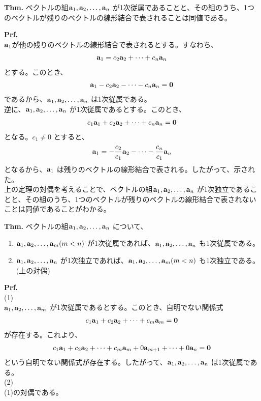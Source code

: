 \documentclass[a4paper,11pt]{jsarticle}
\numberwithin{equation}{section}
\begin{document}
\begin{itembox}[l]{\textbf{Thm.}}
  ベクトルの組$\vb{a}_1, \vb{a}_2, \dots, \vb{a}_n$ が1次従属であることと、その組のうち、1つのベクトルが残りのベクトルの線形結合で表されることは同値である。
\end{itembox}
\textbf{Prf.}\\
$\vb{a}_1$が他の残りのベクトルの線形結合で表されるとする。すなわち、
\begin{align}
  \vb{a}_1 = c_2\vb{a}_2 + \dots + c_n\vb{a}_n
\end{align}
とする。このとき、
\begin{align}
  \vb{a}_1 - c_2\vb{a}_2 - \dots - c_n\vb{a}_n = \vb{0}
\end{align}
であるから、$\vb{a}_1, \vb{a}_2, \dots, \vb{a}_n$ は1次従属である。\\
逆に、$\vb{a}_1, \vb{a}_2, \dots, \vb{a}_n$ が1次従属であるとする。このとき、
\begin{align}
  c_1\vb{a}_1 + c_2\vb{a}_2 + \dots + c_n\vb{a}_n = \vb{0}
\end{align}
となる。$c_1 \neq 0$ とすると、
\begin{align}
  \vb{a}_1 = -\frac{c_2}{c_1}\vb{a}_2 - \dots - \frac{c_n}{c_1}\vb{a}_n
\end{align}
となるから、$\vb{a}_1$ は残りのベクトルの線形結合で表される。したがって、示された。\hfill\qedsymbol\\

上の定理の対偶を考えることで、ベクトルの組$\vb{a}_1, \vb{a}_2, \dots, \vb{a}_n$ が1次独立であることと、その組のうち、1つのベクトルが残りのベクトルの線形結合で表されないことは同値であることがわかる。\\

\begin{itembox}[l]{\textbf{Thm.}}
  ベクトルの組$\vb{a}_1, \vb{a}_2, \dots, \vb{a}_n$ について、
  \begin{enumerate}
    \item $\vb{a}_1, \vb{a}_2, \dots, \vb{a}_m (m < n)$ が1次従属であれば、$\vb{a}_1, \vb{a}_2, \dots, \vb{a}_n$ も1次従属である。
    \item $\vb{a}_1, \vb{a}_2, \dots, \vb{a}_n$ が1次独立であれば、$\vb{a}_1, \vb{a}_2, \dots, \vb{a}_m (m < n)$ も1次独立である。(上の対偶)
  \end{enumerate}
\end{itembox}
\textbf{Prf.}\\
(1)\\
$\vb{a}_1, \vb{a}_2, \dots, \vb{a}_m$ が1次従属であるとする。このとき、自明でない関係式
\begin{align}
  c_1\vb{a}_1 + c_2\vb{a}_2 + \dots + c_m\vb{a}_m = \vb{0}
\end{align}
が存在する。これより、
\begin{align}
  c_1\vb{a}_1 + c_2\vb{a}_2 + \dots + c_m\vb{a}_m + 0\vb{a}_{m+1} + \dots + 0\vb{a}_n = \vb{0}
\end{align}
という自明でない関係式が存在する。したがって、$\vb{a}_1, \vb{a}_2, \dots, \vb{a}_n$ は1次従属である。\\
(2)\\
(1)の対偶である。\hfill\qedsymbol\\
\end{document}
